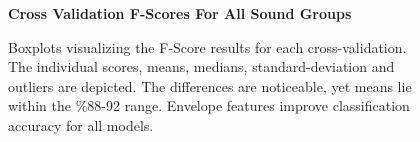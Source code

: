 \documentclass[\main/thesis.tex]{subfiles}
\begin{document}
\begin{figure}[htbp!]
    \begin{center}
    \textbf{Cross Validation F-Scores For All Sound Groups}\par\medskip
    \caption{Boxplots visualizing the F-Score results for each cross-validation. The individual scores, means, medians, standard-deviation and outliers are depicted. The differences are noticeable, yet means lie within the \%88-92 range. Envelope features improve classification accuracy for all models. }
    \label{fig:f1_allg_box}
    \end{center}
\end{figure}
\end{document}
